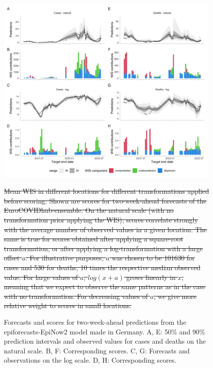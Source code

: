 \documentclass{article}
\providecommand{\DIFdeltex}[1]{{\protect\color{red}\sout{#1}}}                      %
\providecommand{\DIFdelFL}[1]{\DIFdel{#1}} %
\providecommand{\DIFdelbeginFL}{} %
\providecommand{\DIFdelendFL}{} %
\providecommand{\DIFdel}[1]{\texorpdfstring{\DIFdeltex{#1}}{}} %
\newcommand{\DIFscaledelfig}{0.5}
\newlength{\DIFdelgraphicswidth} %
\newlength{\DIFdelgraphicsheight} %
\newcommand{\DIFdelincludegraphics}[2][]{%
\sbox{\DIFdelgraphicsbox}{\DIFOincludegraphics[#1]{#2}}%
\settoboxwidth{\DIFdelgraphicswidth}{\DIFdelgraphicsbox} %
\settoboxtotalheight{\DIFdelgraphicsheight}{\DIFdelgraphicsbox} %
\scalebox{\DIFscaledelfig}{%
\parbox[b]{\DIFdelgraphicswidth}{\usebox{\DIFdelgraphicsbox}\\[-\baselineskip] \rule{\DIFdelgraphicswidth}{0em}}\llap{\resizebox{\DIFdelgraphicswidth}{\DIFdelgraphicsheight}{%
\setlength{\unitlength}{\DIFdelgraphicswidth}%
\begin{picture}(1,1)%
\thicklines\linethickness{2pt} %
{\color[rgb]{1,0,0}\put(0,0){\framebox(1,1){}}}%
{\color[rgb]{1,0,0}\put(0,0){\line( 1,1){1}}}%
{\color[rgb]{1,0,0}\put(0,1){\line(1,-1){1}}}%
\end{picture}%
}\hspace*{3pt}}} %
} %
\DeclareRobustCommand{\DIFdelbeginFL}{\DIFOdelbeginFL \let\includegraphics\DIFdelincludegraphics} %
\DeclareRobustCommand{\DIFdelendFL}{\DIFOaddendFL \let\includegraphics\DIFOincludegraphics} %
\begin{document}
\begin{figure}[h!]
    \centering
    \includegraphics[width=0.99\textwidth]{output/figures/HUB-model-comparison-epinow.png}
    \caption{
    Forecasts and scores for two-week-ahead predictions from the epiforecasts-EpiNow2 model \citep{epinow2} made in Germany. A, E: 50\% and 90\% prediction intervals and observed values for cases and deaths on the natural scale. B, F: Corresponding scores. C, G: Forecasts and observations on the log scale. D, H: Corresponding scores. 
    }
    \label{fig:HUB-model-comparison-epinow}
\DIFdelbeginFL %

{%
\DIFdelFL{Mean WIS in different locations for different transformations applied before scoring. Shown are scores for two-week-ahead forecasts of the EuroCOVIDhub-ensemble. On the natural scale (with no transformation prior applying the WIS), scores correlate strongly with the average number of observed values in a given location. The same is true for scores obtained after applying a square-root transformation, or after applying a log-transformation with a large offset $a$. For illustrative purposes, $a$ was chosen to be 101630 for cases and 530 for deaths, 10 times the respective median observed value. For large values of $a$, $log(x + a)$ grows linearly in $x$, meaning that we expect to observe the same patterns as in the case with no transformation. For decreasing values of $a$, we give more relative weight to scores in small locations.}}
\DIFdelendFL \end{figure}




\clearpage

\end{document}
